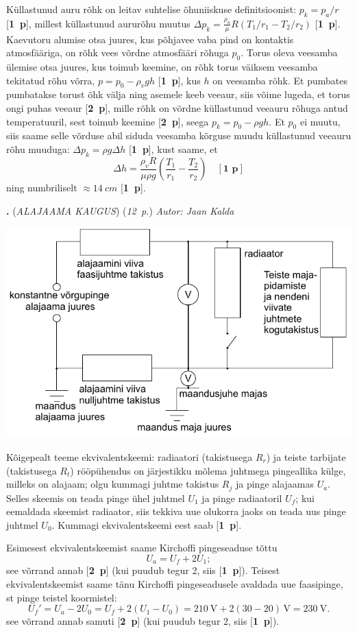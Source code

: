 \documentclass[11pt,a5paper]{article}
\newcommand{\numb}[1]{\vspace{5pt}\textbf{\large #1}}
\newcommand{\nimi}[1]{(\textsl{\small #1})}
\newcommand{\punktid}[1]{(\emph{#1~p.})}
\newcommand{\p}[1]{[\textbf{#1~p}]}
\newcounter{ylesanne}
\newcommand{\yl}[1]{\addtocounter{ylesanne}{1}\numb{\theylesanne.} \nimi{#1} \newblock{}}
\newcommand{\autor}[1]{\emph{Autor: #1}}%
\begin{document}
Küllastunud auru rõhk on leitav suhtelise õhuniiskuse definitsioonist: $p_k=p_a/r$ \p{1}, millest küllastunud aururõhu muutus $\Delta p_k=\frac {\rho_a}\mu R(T_1/r_1-T_2/r_2)$ \p{1}. Kaevutoru alumise otsa juures, kus põhjavee vaba pind on kontaktis atmosfääriga, on rõhk vees võrdne atmosfääri rõhuga $p_0$. Torus oleva veesamba ülemise otsa juures, kus toimub keemine, on rõhk torus väiksem veesamba tekitatud rõhu võrra, $p=p_0-\rho_v gh$ \p{1}, kus $h$ on veesamba rõhk. Et pumbates pumbatakse torust õhk välja ning asemele keeb veeaur, siis võime lugeda, et torus ongi puhas veeaur \p{2}, mille rõhk on võrdne küllastunud veeauru rõhuga antud temperatuuril, sest toimub keemine \p{2}, seega $p_k=p_0-\rho gh$. Et $p_0$ ei muutu, siis saame selle võrduse abil siduda veesamba kõrguse muudu küllastunud veeauru rõhu muuduga: $\Delta p_k=\rho g\Delta h$ \p{1}, kust saame, et
$$\Delta h=\frac {\rho_vR}{\mu\rho g}  \left(\frac{T_1}{r_1}-\frac{T_2}{r_2}\right)\quad\p{1}$$
ning numbriliselt $\approx \SI{14}{cm}$ \p{1}.

\newpage
\yl{ALAJAAMA KAUGUS}
\punktid{12} \autor{Jaan Kalda}

\begin{center}
    \includegraphics[width=0.8\linewidth]{alajaam_lah_joonis.pdf}
\end{center}

Kõigepealt teeme ekvivalentskeemi: radiaatori (takistusega $R_r$) ja teiste tarbijate (takistusega $R_t$) rööpühendus on järjestikku mõlema juhtmega pingeallika külge, milleks on alajaam; olgu kummagi juhtme takistus $R_j$ ja pinge alajaamas $U_a$. Selles skeemis on teada pinge ühel juhtmel $U_1$ ja pinge radiaatoril $U_f$; kui eemaldada skeemist radiaator, siis tekkiva uue olukorra jaoks on teada uus pinge juhtmel $U_0$. Kummagi ekvivalentskeemi eest saab \p{1}.

Esimesest ekvivalentskeemist saame Kirchoffi pingeseaduse tõttu 
$$U_a=U_f+2U_1;$$
see võrrand annab \p{2} (kui puudub tegur 2, siis \p{1}). 
Teisest ekvivalentskeemist saame tänu Kirchoffi pingeseadusele avaldada uue faasipinge, st pinge teistel koormistel:
$$U_f'=U_a-2U_0=U_f+2(U_1-U_0)=\SI{210}{\V} + 2(30-20)\,\si{\V} = \SI{230}{\V}.$$
see võrrand annab samuti \p{2} (kui puudub tegur 2, siis \p{1}).
\end{document}
